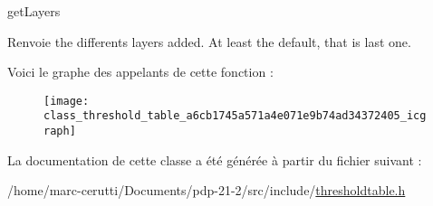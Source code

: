 get\+Layers 

\begin{DoxyReturn}{Renvoie}
the differents layers added. At least the default, that is last one. 
\end{DoxyReturn}
Voici le graphe des appelants de cette fonction \+:\nopagebreak
\begin{figure}[H]
\begin{center}
\leavevmode
\texttt{[image: class\_threshold\_table\_a6cb1745a571a4e071e9b74ad34372405\_icgraph]}
\end{center}
\end{figure}


La documentation de cette classe a été générée à partir du fichier suivant \+:\begin{DoxyCompactItemize}
\item 
/home/marc-\/cerutti/\+Documents/pdp-\/21-\/2/src/include/\hyperlink{thresholdtable_8h}{thresholdtable.\+h}\end{DoxyCompactItemize}
